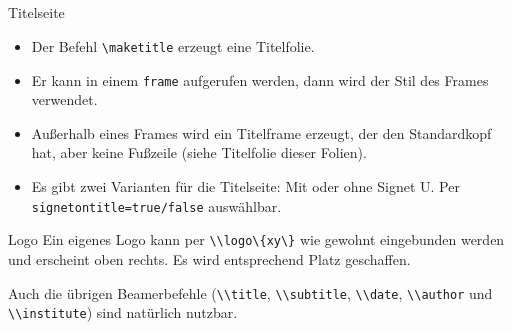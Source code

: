 \documentclass[german,10pt,compress]{beamer}
\begin{document}
\subsection*{}
\begin{frame}[fragile]{Titelseite}
	\begin{itemize}
		\item Der Befehl \lstinline|\maketitle| erzeugt eine Titelfolie.

		\item Er kann in einem \lstinline|frame| aufgerufen werden, dann wird der Stil des Frames verwendet.

		\item Außerhalb eines Frames wird ein Titelframe erzeugt, der den Standardkopf hat, aber keine Fußzeile (siehe Titelfolie dieser Folien).

		\item Es gibt zwei Varianten für die Titelseite: Mit oder ohne Signet U. Per \lstinline|signetontitle=true/false| auswählbar.
	\end{itemize}
\end{frame}
\begin{frame}{Logo}
	Ein eigenes Logo kann per \lstinline|\\logo\{xy\}| wie gewohnt eingebunden werden und erscheint oben rechts. Es wird entsprechend Platz geschaffen.\par
	Auch die übrigen Beamerbefehle (\lstinline|\\title|, \lstinline|\\subtitle|, \lstinline|\\date|, \lstinline|\\author| und \lstinline|\\institute|) sind natürlich nutzbar.
\end{frame}
\logo{}
\end{document}
